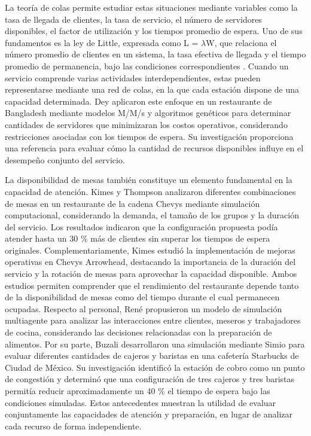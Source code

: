 \documentclass[10pt,a4paper,twocolumn]{article}
\begin{document}
La teoría de colas permite estudiar estas situaciones mediante variables como la tasa de llegada de clientes, la tasa de servicio, el número de servidores disponibles, el factor de utilización y los tiempos promedio de espera. Uno de sus fundamentos es la ley de Little, expresada como L = \(\lambda\)W, que relaciona el número promedio de clientes en un sistema, la tasa efectiva de llegada y el tiempo promedio de permanencia, bajo las condiciones correspondientes \cite{ref1}. Cuando un servicio comprende varias actividades interdependientes, estas pueden representarse mediante una red de colas, en la que cada estación dispone de una capacidad determinada. Dey \cite{ref2} aplicaron este enfoque en un restaurante de Bangladesh mediante modelos M/M/s y algoritmos genéticos para determinar cantidades de servidores que minimizaran los costos operativos, considerando restricciones asociadas con los tiempos de espera. Su investigación proporciona una referencia para evaluar cómo la cantidad de recursos disponibles influye en el desempeño conjunto del servicio.

La disponibilidad de mesas también constituye un elemento fundamental en la capacidad de atención. Kimes y Thompson \cite{ref4} analizaron diferentes combinaciones de mesas en un restaurante de la cadena Chevys mediante simulación computacional, considerando la demanda, el tamaño de los grupos y la duración del servicio. Los resultados indicaron que la configuración propuesta podía atender hasta un 30 \% más de clientes sin superar los tiempos de espera originales. Complementariamente, Kimes \cite{ref5} estudió la implementación de mejoras operativas en Chevys Arrowhead, destacando la importancia de la duración del servicio y la rotación de mesas para aprovechar la capacidad disponible. Ambos estudios permiten comprender que el rendimiento del restaurante depende tanto de la disponibilidad de mesas como del tiempo durante el cual permanecen ocupadas. Respecto al personal, René \cite{ref7} propusieron un modelo de simulación multiagente para analizar las interacciones entre clientes, meseros y trabajadores de cocina, considerando las decisiones relacionadas con la preparación de alimentos. Por su parte, Buzali \cite{ref8} desarrollaron una simulación mediante Simio para evaluar diferentes cantidades de cajeros y baristas en una cafetería Starbucks de Ciudad de México. Su investigación identificó la estación de cobro como un punto de congestión y determinó que una configuración de tres cajeros y tres baristas permitía reducir aproximadamente un 40 \% el tiempo de espera bajo las condiciones simuladas. Estos antecedentes muestran la utilidad de evaluar conjuntamente las capacidades de atención y preparación, en lugar de analizar cada recurso de forma independiente.
\end{document}
